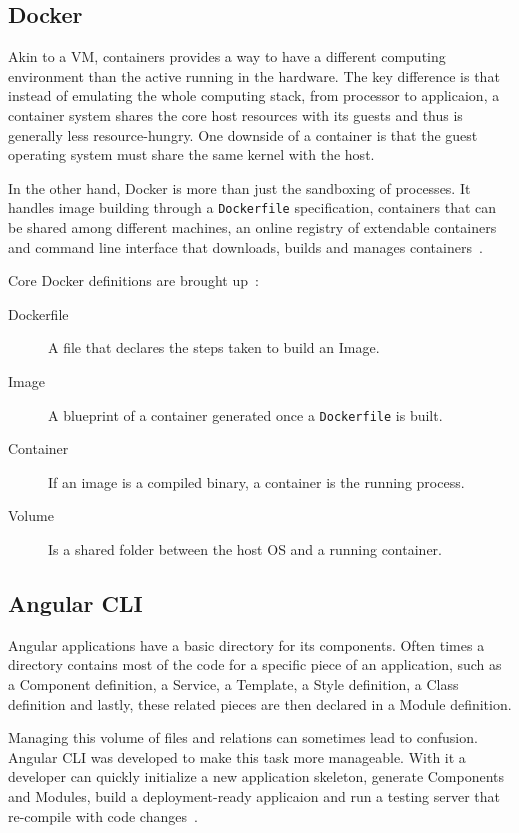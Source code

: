 \subsection{Docker}
Akin to a \gls{VM}, containers provides a way to have a different computing environment than the active running in the hardware. The key difference is that instead of emulating the whole computing stack, from processor to applicaion, a container system shares the core host resources with its guests and thus is generally less resource-hungry. One downside of a container is that the guest operating system must share the same kernel with the host.

In the other hand, Docker is more than just the sandboxing of processes. It handles image building through a \texttt{Dockerfile} specification, containers that can be shared among different machines, an online registry of extendable containers and command line interface that downloads, builds and manages containers~\cite{dockerfag}.

Core Docker definitions are brought up~\cite{dockeroverview}:

\begin{description}
\item[Dockerfile] A file that declares the steps taken to build an Image.
\item[Image] A blueprint of a container generated once a \texttt{Dockerfile} is built.
\item[Container] If an image is a compiled binary, a container is the running process. 
\item[Volume] Is a shared folder between the host \gls{OS} and a running container.
\end{description}

\subsection{Angular CLI}\label{angularcli}
Angular applications have a basic directory for its components. Often times a directory contains most of the code for a specific piece of an application, such as a Component definition, a Service, a Template, a Style definition, a Class definition and lastly, these related pieces are then declared in a Module definition.

Managing this volume of files and relations can sometimes lead to confusion. Angular \gls{CLI} was developed to make this task more manageable. With it a developer can quickly initialize a new application skeleton, generate Components and Modules, build a deployment-ready applicaion and run a testing server that re-compile with code changes~\cite{angularcli}.

